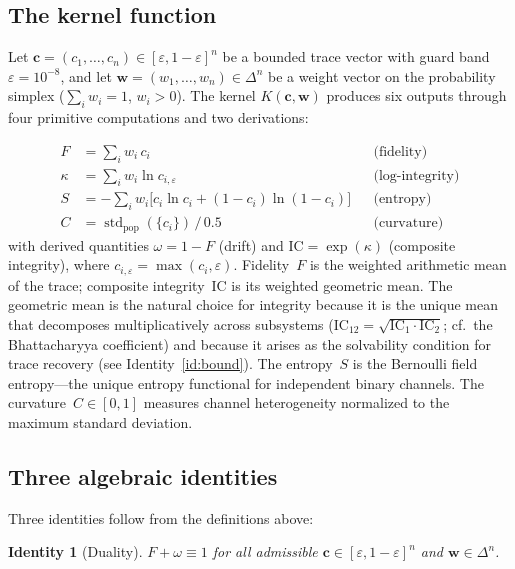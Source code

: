 \documentclass[11pt]{article}
\newcommand{\eps}{\varepsilon}
\newcommand{\IC}{\mathrm{IC}}
\newcommand{\tvec}{\mathbf{c}}
\newcommand{\wvec}{\mathbf{w}}
\DeclareMathOperator{\std}{std}
\newtheorem{identity}[theorem]{Identity}
\begin{document}
\subsection{The kernel function}

Let $\tvec = (c_1, \ldots, c_n) \in [\eps, 1-\eps]^n$ be a bounded
trace vector with guard band $\eps = 10^{-8}$, and let
$\wvec = (w_1, \ldots, w_n) \in \Delta^n$ be a weight vector on the
probability simplex ($\sum_i w_i = 1$, $w_i > 0$). The kernel
$K(\tvec, \wvec)$ produces six outputs through four primitive
computations and two derivations:

\begin{align}
  F &= \textstyle\sum_i w_i \, c_i
    && \text{(fidelity)} \label{eq:F} \\
  \kappa &= \textstyle\sum_i w_i \ln c_{i,\eps}
    && \text{(log-integrity)} \label{eq:kappa} \\
  S &= -\textstyle\sum_i w_i \bigl[c_i \ln c_i + (1{-}c_i)\ln(1{-}c_i)\bigr]
    && \text{(entropy)} \label{eq:S} \\
  C &= \std_{\mathrm{pop}}(\{c_i\})\,/\,0.5
    && \text{(curvature)} \label{eq:C}
\end{align}
with derived quantities $\omega = 1 - F$ (drift) and
$\IC = \exp(\kappa)$ (composite integrity), where
$c_{i,\eps} = \max(c_i, \eps)$. Fidelity~$F$ is the weighted
arithmetic mean of the trace; composite integrity~$\IC$ is its
weighted geometric mean. The geometric mean is the natural choice
for integrity because it is the unique mean that decomposes
multiplicatively across subsystems
($\IC_{12} = \sqrt{\IC_1 \cdot \IC_2}$; cf.\ the Bhattacharyya
coefficient) and because it arises as the solvability condition
for trace recovery (see Identity~\ref{id:bound}). The entropy~$S$
is the Bernoulli field entropy---the unique entropy functional for
independent binary channels. The curvature~$C \in [0,1]$ measures
channel heterogeneity normalized to the maximum standard deviation.

\subsection{Three algebraic identities}

Three identities follow from the definitions above:

\begin{identity}[Duality]
\label{id:duality}
$F + \omega \equiv 1$ for all admissible $\tvec \in [\eps, 1{-}\eps]^n$
and $\wvec \in \Delta^n$.
\end{identity}
\end{document}
